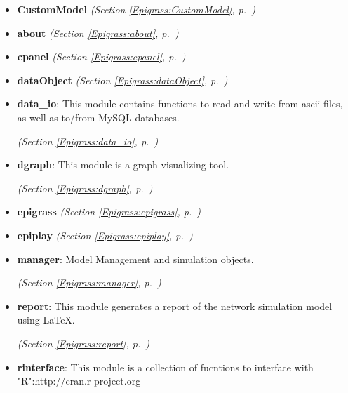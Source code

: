\begin{itemize}
\setlength{\parskip}{0ex}
\item \textbf{CustomModel}
  \textit{(Section \ref{Epigrass:CustomModel}, p.~\pageref{Epigrass:CustomModel})}

\item \textbf{about}
  \textit{(Section \ref{Epigrass:about}, p.~\pageref{Epigrass:about})}

\item \textbf{cpanel}
  \textit{(Section \ref{Epigrass:cpanel}, p.~\pageref{Epigrass:cpanel})}

\item \textbf{dataObject}
  \textit{(Section \ref{Epigrass:dataObject}, p.~\pageref{Epigrass:dataObject})}

\item \textbf{data\_io}: This module contains functions to read and write from ascii files, as well 
as to/from MySQL databases.



  \textit{(Section \ref{Epigrass:data_io}, p.~\pageref{Epigrass:data_io})}

\item \textbf{dgraph}: This module is a graph visualizing tool.



  \textit{(Section \ref{Epigrass:dgraph}, p.~\pageref{Epigrass:dgraph})}

\item \textbf{epigrass}
  \textit{(Section \ref{Epigrass:epigrass}, p.~\pageref{Epigrass:epigrass})}

\item \textbf{epiplay}
  \textit{(Section \ref{Epigrass:epiplay}, p.~\pageref{Epigrass:epiplay})}

\item \textbf{manager}: Model Management and simulation objects.



  \textit{(Section \ref{Epigrass:manager}, p.~\pageref{Epigrass:manager})}

\item \textbf{report}: This module generates a report of the network simulation model using LaTeX.



  \textit{(Section \ref{Epigrass:report}, p.~\pageref{Epigrass:report})}

\item \textbf{rinterface}: This module is a collection of fucntions to interface with 
"R":http://cran.r-project.org




\end{itemize}
